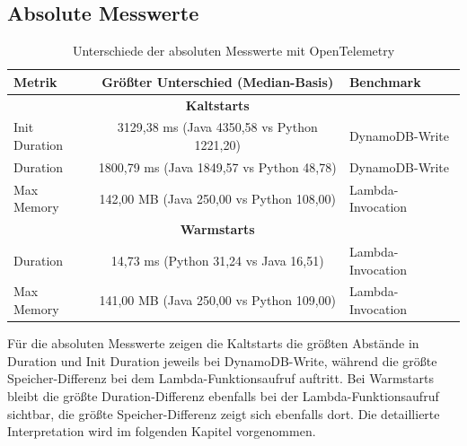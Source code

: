 \subsection{Absolute Messwerte}
\begin{table}[H]
\centering
\footnotesize
\setlength{\tabcolsep}{8pt}
\caption{Unterschiede der absoluten Messwerte mit OpenTelemetry}
\label{res:ranking-largest-differences-absolute}
\begin{tabular}{|l|c|l|}
\hline
\textbf{Metrik} & \textbf{Größter Unterschied (Median-Basis)} & \textbf{Benchmark} \\
\hline
& \textbf{Kaltstarts} & \\
\hline
Init Duration & 3129,38 ms (Java 4350,58 vs Python 1221,20) & DynamoDB-Write \\
\hline
Duration & 1800,79 ms (Java 1849,57 vs Python 48,78) & DynamoDB-Write \\
\hline
Max Memory & 142,00 MB (Java 250,00 vs Python 108,00) & Lambda-Invocation\\
\hline
& \textbf{Warmstarts} & \\
\hline
Duration & 14,73 ms (Python 31,24 vs Java 16,51) & Lambda-Invocation \\
\hline
Max Memory & 141,00 MB (Java 250,00 vs Python 109,00) & Lambda-Invocation \\
\hline
\end{tabular}
\end{table}

Für die absoluten Messwerte zeigen die Kaltstarts die größten Abstände in Duration und Init Duration jeweils bei DynamoDB-Write, während die größte Speicher-Differenz bei dem Lambda-Funktionsaufruf auftritt. Bei Warmstarts bleibt die größte Duration-Differenz ebenfalls bei der Lambda-Funktionsaufruf sichtbar, die größte Speicher-Differenz zeigt sich ebenfalls dort. Die detaillierte Interpretation wird im folgenden Kapitel vorgenommen.

